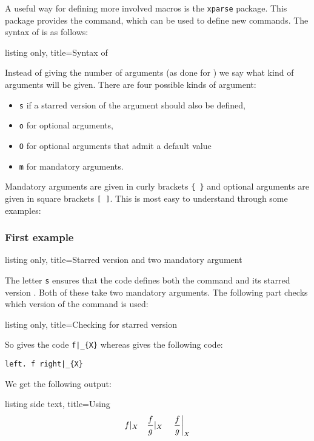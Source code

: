 \documentclass[a4paper, 10pt, headings=standardclasses, oneside, bibliography=totocnumbered]{scrbook}
\begin{document}
A useful way for defining more involved macros is the \texttt{xparse} package.
This package provides the  command, which can be used to define new commands.
The syntax of  is as follows:
\begin{tcblisting}{listing only, title={Syntax of }}
\end{tcblisting}
Instead of giving the number of arguments (as done for ) we say what kind of arguments will be given.
There are four possible kinds of argument:
\begin{itemize}
  \item
    \texttt{s} if a starred version of the argument should also be defined,
  \item
    \texttt{o} for optional arguments,
  \item
    \texttt{O} for optional arguments that admit a default value
  \item 
    \texttt{m} for mandatory arguments.
\end{itemize}
Mandatory arguments are given in curly brackets \texttt{\{ \}} and optional arguments are given in square brackets \texttt{[ ]}.
This is most easy to understand through some examples:

\subsubsection{First example}

\begin{tcblisting}{listing only, title={Starred version and two mandatory argument}}
\end{tcblisting}
The letter \texttt{s} ensures that the code defines both the command  and its starred version .
Both of these take two mandatory arguments.
The following part checks which version of the command is used:
\begin{tcblisting}{listing only, title={Checking for starred version}}
\end{tcblisting}
So  gives the code \texttt{f|\_\{X\}} whereas  gives the following code:
\begin{center}
  \texttt{{\tbs}left. f {\tbs}right|\_\{X\}}
\end{center}
We get the following output:
\begin{tcblisting}{listing side text, title={Using }}
\[
  \restrict{f}{X}
  \quad
  \restrict{\frac{f}{g}}{X}
  \quad
  \restrict*{\frac{f}{g}}{X}
\]
\end{tcblisting}
\end{document}
